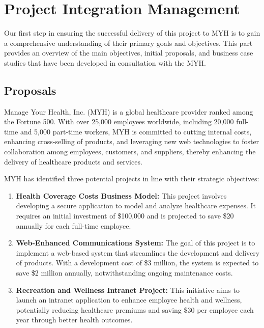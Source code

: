 \chapter{Project Integration Management}

Our first step in ensuring the successful delivery of this project to MYH is to gain a comprehensive understanding of their primary goals and objectives. This part provides an overview of the main objectives, initial proposals, and business case studies that have been developed in consultation with the MYH.

\section{Proposals}

Manage Your Health, Inc. (MYH) is a global healthcare provider ranked among the Fortune 500. With over 25,000 employees worldwide, including 20,000 full-time and 5,000 part-time workers, MYH is committed to cutting internal costs, enhancing cross-selling of products, and leveraging new web technologies to foster collaboration among employees, customers, and suppliers, thereby enhancing the delivery of healthcare products and services.

MYH has identified three potential projects in line with their strategic objectives:

\begin{enumerate}[label=\textbf{\arabic*.}]
    \item \textbf{Health Coverage Costs Business Model:} This project involves developing a secure application to model and analyze healthcare expenses. It requires an initial investment of \$100,000 and is projected to save \$20 annually for each full-time employee.
    
    \item \textbf{Web-Enhanced Communications System:} The goal of this project is to implement a web-based system that streamlines the development and delivery of products. With a development cost of \$3 million, the system is expected to save \$2 million annually, notwithstanding ongoing maintenance costs.
    
    \item \textbf{Recreation and Wellness Intranet Project:} This initiative aims to launch an intranet application to enhance employee health and wellness, potentially reducing healthcare premiums and saving \$30 per employee each year through better health outcomes.
\end{enumerate}

